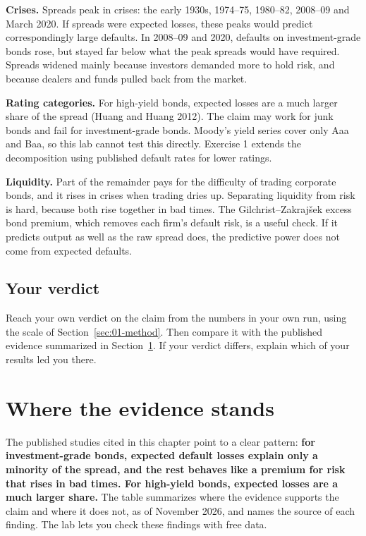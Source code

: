 \textbf{Crises.} Spreads peak in crises: the early 1930s, 1974--75, 1980--82, 2008--09 and March 2020. If spreads were expected losses, these peaks would predict correspondingly large defaults. In 2008--09 and 2020, defaults on investment-grade bonds rose, but stayed far below what the peak spreads would have required. Spreads widened mainly because investors demanded more to hold risk, and because dealers and funds pulled back from the market.

\textbf{Rating categories.} For high-yield bonds, expected losses are a much larger share of the spread (Huang and Huang 2012). The claim may work for junk bonds and fail for investment-grade bonds. Moody's yield series cover only Aaa and Baa, so this lab cannot test this directly. Exercise 1 extends the decomposition using published default rates for lower ratings.

\textbf{Liquidity.} Part of the remainder pays for the difficulty of trading corporate bonds, and it rises in crises when trading dries up. Separating liquidity from risk is hard, because both rise together in bad times. The Gilchrist--Zakraj\v{s}ek excess bond premium, which removes each firm's default risk, is a useful check. If it predicts output as well as the raw spread does, the predictive power does not come from expected defaults.

\subsection*{Your verdict}

Reach your own verdict on the claim from the numbers in your own run, using the scale of Section~\ref{sec:01-method}. Then compare it with the published evidence summarized in Section~\ref{sec:15-verdict}. If your verdict differs, explain which of your results led you there.

\section{Where the evidence stands}
\label{sec:15-verdict}

The published studies cited in this chapter point to a clear pattern: \textbf{for investment-grade bonds, expected default losses explain only a minority of the spread, and the rest behaves like a premium for risk that rises in bad times. For high-yield bonds, expected losses are a much larger share.} The table summarizes where the evidence supports the claim and where it does not, as of November 2026, and names the source of each finding. The lab lets you check these findings with free data.

